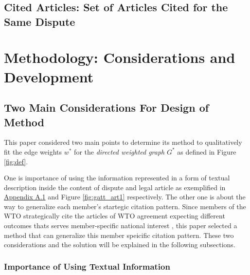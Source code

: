 \documentclass[12pt,letterpaper]{article}
\begin{document}
\subsection{Cited Articles: Set of Articles Cited for the Same Dispute}


\section{Methodology: Considerations and Development}


\subsection{Two Main Considerations For Design of Method}
This paper considered two main points to
determine its method to qualitatively fit the edge weights $w^*$ for the \textit{directed weighted graph} $G^*$ as defined in Figure \ref{fig:def}.

One is importance of using the information represented in a form of textual description inside the content of dispute and legal article as exemplified in \hyperref[sub:factual-aspect-example]{Appendix A.1} and Figure {\ref{fig:gatt_art1}} respectively. The other one is about the way to generalize each member's startegic citation pattern. Since members of the WTO strategically cite 
the articles of WTO agreement expecting different outcomes thats serves member-specific national interest \citep{who_gets, pelc, latent}, this paper
selected a method that can generalize this member speicific citation pattern. These two considerations and the solution will be explained in the following subsections.

\subsubsection{Importance of Using Textual Information}



\end{document}
